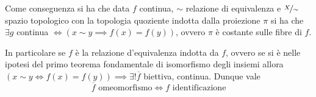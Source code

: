 	\begin{minipage}[t]{0.83\textwidth}
		Come conseguenza si ha che data $f$ continua, $\sim$ relazione di equivalenza e $\nicefrac{X}{\sim}$ spazio topologico con la topologia quoziente indotta dalla proiezione $\pi$ si ha che $\exists g$ continua $\iff \left( x\sim y \implies f(x)=f(y) \right)$, ovvero $\pi$ è costante sulle fibre di $f$.
	\end{minipage}
 	\begin{minipage}[t]{0.13\textwidth}\vspace{-10pt}
	\end{minipage}
	\begin{minipage}[t]{0.83\textwidth}
		In particolare se $f$ è la relazione d'equivalenza indotta da $f$, ovvero se si è nelle ipotesi del primo teorema fondamentale di isomorfismo degli insiemi allora $\left( x\sim y \iff f(x)=f(y) \right) \implies \exists ! \overline{f}$ biettiva, continua. Dunque vale 
			\begin{equation}
				\overline{f} \text{ omeomorfismo} \iff f \text{ identificazione}
			\end{equation}
	 	\end{minipage}
		\begin{minipage}[t]{0.13\textwidth}\vspace{-10pt}
		\end{minipage}\\
	
